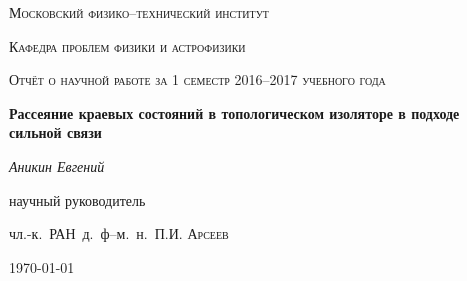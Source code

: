 \begin{titlepage}
	\centering
	{\scshape\LARGE Московский физико--технический институт\par}
	{\scshape Кафедра проблем физики и астрофизики \par}
	\vspace{1cm}
	{\scshape\Large Отчёт о научной работе за 1 семестр 2016--2017 учебного года\par}
	\vspace{1.5cm}
	{\huge\bfseries Рассеяние краевых состояний в топологическом изоляторе 
		в подходе сильной связи\par}
	\vspace{2cm}
	{\Large\itshape Аникин Евгений\par}
	\vfill
	научный руководитель\par
	чл.-к.~РАН~д.~ф--м.~н.~П.И. \textsc{Арсеев}

	\vfill

	{\large \today\par}
\end{titlepage}

